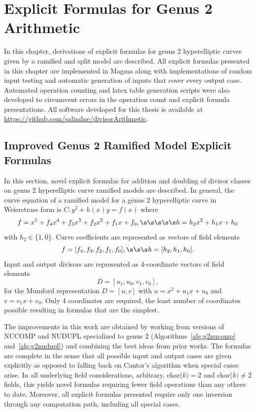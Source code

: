 
\chapter{Explicit Formulas for Genus 2 Arithmetic}\label{cha:g2} 
In this chapter, derivations of explicit formulas for genus 2 hyperelliptic
curves given by a ramified and split model are described. 
All explicit formulas presented in this chapter are
implemented in Magma along with implementations of random input testing and
automatic generation of inputs that cover every output case. Automated
operation counting and latex table generation scripts were also developed to
circumvent errors in the operation count and explicit formula presentations. All
software developed for this thesis is available at
\url{https://github.com/salindne/divisorArithmetic}.


\section{Improved Genus 2 Ramified Model Explicit Formulas}
\label{sec:g2ramExpl}
In this section, novel explicit formulas for addition and doubling of divisor
classes on genus 2 hyperelliptic curve ramified models are described. In
general, the curve equation of a ramified model for a genus 2 hyperelliptic
curve in Weierstrass form is $C: y^2 + h(x)y = f(x)$ where
$$f = x^5 + f_4x^4 + f_3x^3 + f_2 x^2 + f_1x + f_0, \s\s\s\s\s h = h_2x^2 + h_1x
+ h_0$$ with $h_2 \in \{1,0\}$. Curve coefficients are represented as vectors of
field elements $$f = [f_4,f_3,f_2,f_1,f_0], \s\s\s h = [h_2,h_1,h_0].$$ Input
and output divisors are represented as 4-coordinate vectors of field elements $$
D = [u_1,u_0,v_1,v_0],$$ for the Mumford representation $D = [u,v]$ with $u =
x^2 + u_1x + u_0$ and $v = v_1x + v_0$. Only 4 coordinates are required, the
least number of coordinates possible resulting in formulas that are the
simplest.

The improvements in this work are obtained by working from versions of NUCOMP
and NUDUPL specialized to genus 2 (Algorithms~\ref{alg:g2nucomp}
and~\ref{alg:g2nudupl}) and combining the best ideas from prior works. The
formulas are complete in the sense that all possible input and output cases are
given explicitly as opposed to falling back on Cantor's algorithm when special
cases arise. In all underlying field considerations, arbitrary, char($k) = 2$
and char($k) \not = 2$ fields, this yields novel formulas requiring fewer field
operations than any others to date. Moreover,  all explicit formulas presented
require only one inversion through any computation path, including all special
cases. 

